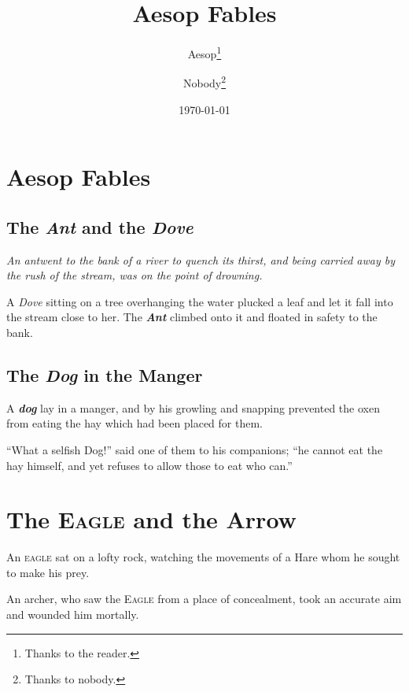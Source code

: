 \documentclass{report}
\title{\bfseries Aesop Fables}
\author{Aesop\thanks{Thanks to the reader.}
       \and Nobody\thanks{Thanks to nobody.}}
\date{\today}
\begin{document}
\maketitle
\tableofcontents
\chapter{Aesop Fables}
\section{The \textsl{Ant} and the \textsl{Dove}}

\itshape
An antwent to the bank of a river to quench its thirst, and
being carried away by the rush of the stream, was on the
point of drowning.
\upshape

A \textsl{Dove} sitting on a tree overhanging the water plucked a
leaf and let it fall into the stream close to her. The \textbf{\textsl{Ant}}
climbed onto it and floated in safety to the bank.

\section{The {\it Dog}\/ in the Manger}

A \textbf{\textit{dog}} lay in a manger, and by his growling and snapping
prevented the oxen from eating the hay which had been
placed for them.

``What a selfish Dog!'' said one of them to his companions;
``he cannot eat the hay himself, and yet refuses to allow
those to eat who can.''

\chapter{The \textsc{Eagle} and the Arrow}

An \textsc{eagle} sat on a lofty rock, watching the movements of a
Hare whom he sought to make his prey.

An archer, who saw the \textsc{Eagle} from a place of concealment,
took an accurate aim and wounded him mortally.
\end{document}
